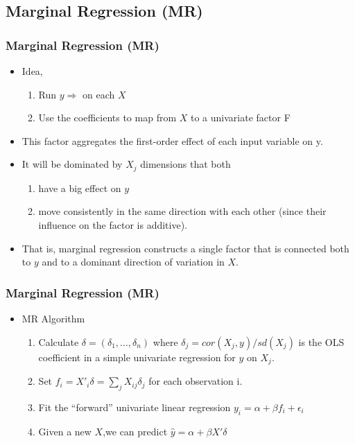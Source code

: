 \documentclass[
  shownotes,
  xcolor={svgnames},
  hyperref={colorlinks,citecolor=DarkBlue,linkcolor=DarkRed,urlcolor=DarkBlue}
  , aspectratio=169]{beamer}
\begin{document}
\subsection{Marginal Regression (MR)}
\begin{frame}[fragile]
\frametitle{Marginal Regression (MR)}

\begin{itemize}
  \item  Idea,
  \begin{enumerate}
    \item Run $y\Rightarrow$ on each $X$
    \item Use the coefficients to map from $X$ to a univariate factor F
  \end{enumerate}
  \medskip
   \item This factor aggregates the first-order effect of each input variable on y. 
  \medskip
\item It will be dominated by $X_j$ dimensions that both 
\begin{enumerate}
\item  have a big effect on $y$ 
\item  move consistently in the same direction with each other (since their influence on the factor is additive). 
\end{enumerate}
\medskip
\item That is, marginal regression constructs a single factor that is connected both to $y$ and to a dominant direction of variation in $X$. 
\end{itemize}

\end{frame}

\begin{frame}[fragile]
\frametitle{Marginal Regression (MR)}

\begin{itemize}
\item MR Algorithm
\medskip
\begin{enumerate}
  \item Calculate $\delta=(\delta_1,...,\delta_n)$ where $\delta_j = cor (X_j, y)/sd(X_j)$ is the OLS coefficient in a simple univariate regression for $y$ on $X_j$. 
  \medskip
  \item Set $f_i = X'_i\delta = \sum_j X_{ij} \delta_j$ for each observation i. 
  \medskip
  \item Fit the “forward” univariate linear regression $y_i = \alpha + \beta f_i + \epsilon_i$
  \medskip
  \item Given a new $X$,we can predict $\hat{y}=\alpha + \beta X'\delta$
\end{enumerate}

\end{itemize}

\end{frame}
\end{document}

